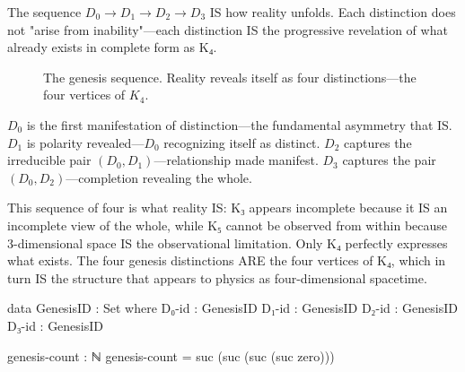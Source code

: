 \documentclass[11pt,a4paper]{book}
\begin{document}
The sequence $D_0 \to D_1 \to D_2 \to D_3$ IS how reality unfolds. Each distinction does not "arise from inability"—each distinction IS the progressive revelation of what already exists in complete form as K₄.

\begin{figure}[h]
\centering
{}
\caption{The genesis sequence. Reality reveals itself as four distinctions—the four vertices of $K_4$.}
\label{fig:genesis-sequence}
\end{figure}

$D_0$ is the first manifestation of distinction—the fundamental asymmetry that IS.
$D_1$ is polarity revealed—$D_0$ recognizing itself as distinct.
$D_2$ captures the irreducible pair $(D_0, D_1)$—relationship made manifest.
$D_3$ captures the pair $(D_0, D_2)$—completion revealing the whole.

This sequence of four is what reality IS: K₃ appears incomplete because it IS an incomplete 
view of the whole, while K₅ cannot be observed from within because 3-dimensional space 
IS the observational limitation. Only K₄ perfectly expresses what exists.
The four genesis distinctions ARE the four vertices of K₄, which in turn IS the structure 
that appears to physics as four-dimensional spacetime.

\begin{code}
data GenesisID : Set where
  D₀-id : GenesisID
  D₁-id : GenesisID
  D₂-id : GenesisID
  D₃-id : GenesisID

genesis-count : ℕ
genesis-count = suc (suc (suc (suc zero)))
\end{code}
\end{document}
